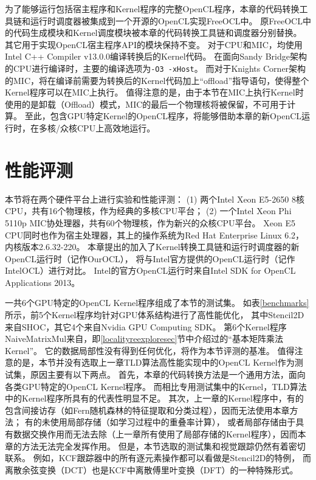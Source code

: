 为了能够运行包括宿主程序和Kernel程序的完整OpenCL程序，本章的代码转换工具链和运行时调度器被集成到一个开源的OpenCL实现\pozhehao FreeOCL中。
原FreeOCL中的代码生成模块和Kernel调度模块被本章的代码转换工具链和调度器分别替换。
其它用于实现OpenCL宿主程序API的模块保持不变。
对于CPU和MIC，均使用Intel C++ Compiler v13.0.0编译转换后的Kernel代码。
在面向Sandy Bridge架构的CPU进行编译时，主要的编译选项为\texttt{-O3 -xHost}。
而对于Knights Corner架构的MIC，将在编译前需要为转换后的Kernel代码加上``offload''指导语句，使得整个Kernel程序可以在MIC上执行。
值得注意的是，由于本节在MIC上执行Kernel时使用的是卸载（Offload）模式，MIC的最后一个物理核将被保留，不可用于计算。
至此，包含GPU特定Kernel的OpenCL程序，将能够借助本章的新OpenCL运行时，在多核/众核CPU上高效地运行。

\section{性能评测}
\label{kernelexperimentsec}
本节将在两个硬件平台上进行实验和性能评测：
(1) 两个Intel Xeon E5-2650 8核CPU，共有16个物理核，作为经典的多核CPU平台；
(2) 一个Intel Xeon Phi 5110p MIC协处理器，共有60个物理核，作为新兴的众核CPU平台。
Xeon E5 CPU同时也作为宿主处理器，其上的操作系统为Red Hat Enterprise Linux 6.2，内核版本2.6.32-220。
本章提出的加入了Kernel转换工具链和运行时调度器的新OpenCL运行时（记作OurOCL），
将与Intel官方提供的OpenCL运行时（记作IntelOCL）进行对比。
Intel的官方OpenCL运行时来自Intel SDK for OpenCL Applications 2013。

一共6个GPU特定的OpenCL Kernel程序组成了本节的测试集。
如表\ref{benchmarks}所示，前5个Kernel程序均针对GPU体系结构进行了高性能优化，
其中Stencil2D来自SHOC，其它4个来自Nvidia GPU Computing SDK。
第6个Kernel程序NaiveMatrixMul来自\cite{oclprogrammingguide}，即\ref{localityreexploresec}节中介绍过的``基本矩阵乘法Kernel''。
它的数据局部性没有得到任何优化，将作为本节评测的基准。
值得注意的是，本节并没有选取上一章TLD算法高性能实现中的OpenCL Kernel作为测试集，原因主要有以下两点。
首先，本章的代码转换方法是一个通用方法，面向各类GPU特定的OpenCL Kernel程序。
而相比专用测试集中的Kernel，TLD算法中的Kernel程序所具有的代表性明显不足。
其次，上一章的Kernel程序中，有的包含间接访存（如Fern随机森林的特征提取和分类过程），因而无法使用本章方法；
有的未使用局部存储（如学习过程中的重叠率计算），
或者局部存储由于具有数据交换作用而无法去除（上一章所有使用了局部存储的Kernel程序），因而本章的方法无法完全发挥作用。
但是，本节选取的测试集和视觉跟踪仍然有着密切联系。
例如，KCF跟踪器中的所有逐元素操作都可以看做是Stencil2D的特例，
而离散余弦变换（DCT）也是KCF中离散傅里叶变换（DFT）的一种特殊形式。





